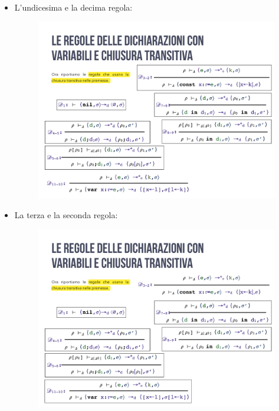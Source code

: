 \documentclass[a4paper]{article}
\begin{document}
\begin{itemize}
 		\item L'undicesima e la decima regola:
 		\begin{figure}[!htp]
 			\centering
 			\includegraphics[width=\textwidth]{img/regola_dichiarazione-up-transitiva-11_10.pdf}
 		\end{figure}
 	
 		\item La terza e la seconda regola:
 		\begin{figure}[!htp]
 			\centering
 			\includegraphics[width=\textwidth]{img/regola_dichiarazione-up-transitiva-3_2.pdf}
 		\end{figure}
 	

\end{itemize}
\end{document}
